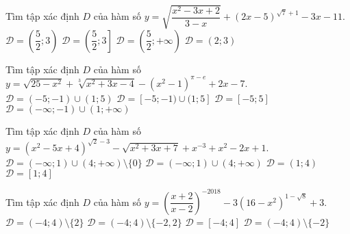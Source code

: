 \begin{ex}%
	Tìm tập xác định $D$ của hàm số $y=\sqrt{\dfrac{x^2-3x+2}{3-x}}+(2x-5)^{\sqrt{7}+1}-3x-11$. 
	\choice
	{\True $\mathscr{D}=\left(\dfrac{5}{2}; 3\right)$}
	{$\mathscr{D}=\left(\dfrac{5}{2}; 3\right]$}
	{$\mathscr{D}=\left(\dfrac{5}{2};+\infty\right)$}
	{$\mathscr{D}=(2; 3)$}
\end{ex}
\begin{ex}%
	Tìm tập xác định $D$ của hàm số $y=\sqrt{25-x^2}+\sqrt[3]{x^2+3x-4}-\left(x^2-1\right)^{\pi-e}+2x-7$. 
	\choice
	{$\mathscr{D}=(-5;-1)\cup(1; 5)$}
	{\True $\mathscr{D}=[-5;-1)\cup(1; 5]$}
	{$\mathscr{D}=[-5; 5]$}
	{$\mathscr{D}=(-\infty;-1)\cup(1;+\infty)$}
\end{ex}
\begin{ex}%
	Tìm tập xác định $D$ của hàm số $y=\left(x^2-5x+4\right)^{\sqrt{2}-3}-\sqrt{x^2+3x+7}+x^{-3}+x^2-2x+1$. 
	\choice
	{\True $\mathscr{D}=(-\infty; 1)\cup(4;+\infty)\setminus\{0\}$}
	{$\mathscr{D}=(-\infty; 1)\cup(4;+\infty)$}
	{$\mathscr{D}=(1; 4)$}
	{$\mathscr{D}=[1; 4]$}
\end{ex}
\begin{vd}%
	Tìm tập xác định $D$ của hàm số $y=\left(\dfrac{x+2}{x-2}\right)^{-2018}-3\left(16-x^2\right)^{1-\sqrt{8}}+3$. 
	\choice
	{$\mathscr{D}=(-4; 4)\setminus\{2\}$}
	{\True $\mathscr{D}=(-4; 4)\setminus\{-2, 2\}$}
	{$\mathscr{D}=[-4; 4]$}
	{$\mathscr{D}=(-4; 4)\setminus\{-2\}$}
\end{vd}
